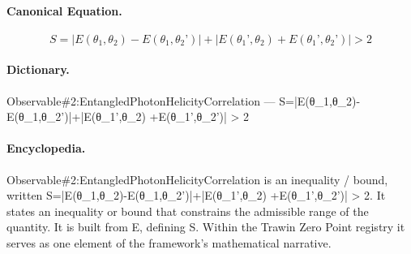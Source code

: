 \paragraph{Canonical Equation.}
\[
S=|E(\theta_1,\theta_2)-E(\theta_1,\theta_2’)|+|E(\theta_1’,\theta_2) +E(\theta_1’,\theta_2’)| > 2
\]

\paragraph{Dictionary.}
Observable\#2:EntangledPhotonHelicityCorrelation — S=|E(θ\_1,θ\_2)-E(θ\_1,θ\_2’)|+|E(θ\_1’,θ\_2) +E(θ\_1’,θ\_2’)| > 2

\paragraph{Encyclopedia.}
Observable\#2:EntangledPhotonHelicityCorrelation is an inequality / bound, written S=|E(θ\_1,θ\_2)-E(θ\_1,θ\_2’)|+|E(θ\_1’,θ\_2) +E(θ\_1’,θ\_2’)| > 2. It states an inequality or bound that constrains the admissible range of the quantity. It is built from E, defining S. Within the Trawin Zero Point registry it serves as one element of the framework's mathematical narrative.
